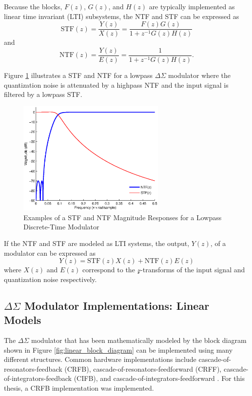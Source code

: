 Because the blocks, $F(z)$, $G(z)$, and $H(z)$ are typically implemented as linear time
invariant (LTI) subsystems, the NTF and STF can be expressed as 
\begin{equation}\label{eq:STF}
\text{STF}(z)=\frac{Y(z)}{X(z)}=\frac{F(z)G(z)}{1+z^{-1}G(z)H(z)}
\end{equation}
and
\begin{equation}\label{eq:NTF}
\text{NTF}(z)=\frac{Y(z)}{E(z)}=\frac{1}{1+z^{-1}G(z)H(z)}\text{.}
\end{equation}

Figure \ref{fig:DSM_loop_filters} illustrates a STF and NTF for a lowpass $\Delta\Sigma$
modulator where the quantization noise is attenuated by a highpass NTF and the input
signal is filtered by a lowpass STF.
\begin{figure}[htbp]
	\centering
	\includegraphics[width=0.65\textwidth]{./matlab_figures/LPDSM_spec_ex}
	\caption[Example: \DS Modulator Magnitude Response]{Examples of a STF and NTF
Magnitude Responses for a Lowpass Discrete-Time \DS Modulator}
	\label{fig:DSM_loop_filters}
\end{figure}
If the NTF and STF are modeled as LTI systems, the output, $Y(z)$, of a \DS modulator can
be expressed as
\begin{equation}\label{eq:DSM_output}
 Y(z)=\text{STF}(z)X(z)+\text{NTF}(z)E(z)
\end{equation}
where $X(z)$ and $E(z)$ correspond to the $\mathcal{z}$-transforms of the input signal
and quantization noise respectively.

\subsection[Delta Sigma Modulator Implementations: Linear Models]
{$\Delta\Sigma$ Modulator Implementations: Linear Models}
The $\Delta\Sigma$ modulator that has been mathematically modeled by the block
diagram shown in Figure \ref{fig:linear_block_diagram} can be implemented using many
different structures. Common hardware implementations include
cascade-of-resonators-feedback (CRFB), cascade-of-resonators-feedforward (CRFF),
cascade-of-integrators-feedback (CIFB), and cascade-of-integrators-feedforward
\cite{schreier_understanding_2004}. For this thesis, a CRFB implementation was
implemented.

